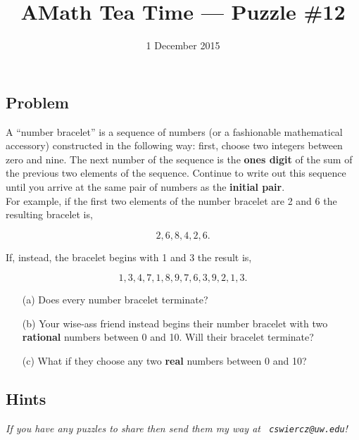 \documentclass[12pt]{article}
\title{AMath Tea Time --- Puzzle \#12}
\author{}
\date{\vspace{-1cm}1 December 2015}
\begin{document}
\maketitle
{}

\subsection*{Problem}

\noindent A ``number bracelet'' is a sequence of numbers (or a fashionable
mathematical accessory) constructed in the following way: first, choose two
integers between zero and nine. The next number of the sequence is the {\bf ones
  digit} of the sum of the previous two elements of the sequence. Continue to
write out this sequence until you arrive at the same pair of numbers as the {\bf
  initial pair}. \\

\noindent For example, if the first two elements of the number bracelet are 2
and 6 the resulting bracelet is,

\[
2,6,8,4,2,6.
\]

\noindent If, instead, the bracelet begins with 1 and 3 the result is,

\[
1,3,4,7,1,8,9,7,6,3,9,2,1,3.
\]

\begin{itemize}
  \item[(a)] Does every number bracelet terminate?
  \item[(b)] Your wise-ass friend instead begins their number bracelet with two
    {\bf rational} numbers between 0 and 10. Will their bracelet terminate?
  \item[(c)] What if they choose any two {\bf real} numbers between 0 and 10?
\end{itemize}

\subsection*{Hints}

{
\par\vspace*{\fill}
\noindent \small \it
If you have any puzzles to share then send them my way at {\tt
  cswiercz@uw.edu}!
}
\end{document}
